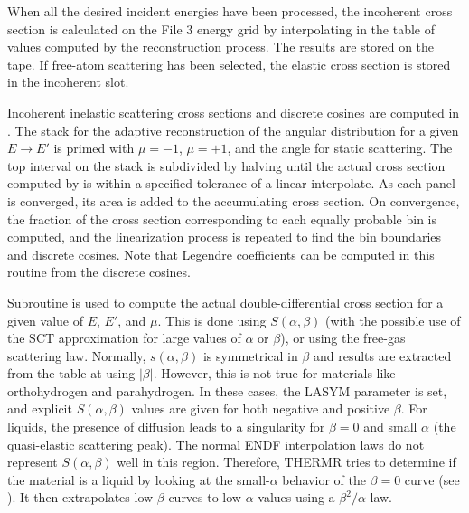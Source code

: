 When all the desired incident energies have been processed, the incoherent
cross section is calculated on the File 3 energy grid by interpolating
in the table of values computed by the reconstruction process.  The
results are stored on the  tape.  If free-atom
scattering has been selected, the elastic cross section is stored in
the incoherent slot.

Incoherent inelastic scattering cross sections and discrete cosines are
computed in .  The stack for
the adaptive reconstruction of the angular distribution for a
given $E{\rightarrow}E'$ is primed with $\mu{=}{-}1$,
$\mu{=}{+}1$, and the angle for static scattering.  The top
interval on the stack is subdivided by halving until the actual cross
section computed by  is within a specified tolerance of a linear
interpolate.  As each panel is converged, its area is added to the
accumulating cross section.  On convergence, the fraction of the cross
section corresponding to each equally probable bin is computed, and
the linearization process is repeated to find the bin boundaries and
discrete cosines.  Note that Legendre coefficients can be computed in
this routine from the discrete cosines.

Subroutine 
is used to compute the actual double-differential
cross section for a given value of $E$, $E'$, and $\mu$.  This
is done using $S(\alpha,\beta)$ (with the possible use of the SCT
approximation for large values of $\alpha$ or $\beta$), or using
the free-gas scattering law.   Normally, $s(\alpha,\beta)$ is
symmetrical in $\beta$ and results are extracted from the table at
 using $|\beta|$.  However, this is not true for materials
like orthohydrogen and parahydrogen.  In these cases, the LASYM
parameter is set, and explicit $S(\alpha,\beta)$ values are given
for both negative and positive $\beta$.  For liquids, the presence
of diffusion leads to a singularity for $\beta=0$ and small $\alpha$
(the quasi-elastic scattering peak).  The normal ENDF interpolation
laws do not represent $S(\alpha,\beta)$ well in this region.  Therefore,
THERMR tries to determine if the material is a liquid by looking
at the small-$\alpha$ behavior of the $\beta=0$ curve (see ).
It then extrapolates low-$\beta$ curves to low-$\alpha$ values
using a $\beta^2/\alpha$ law.

